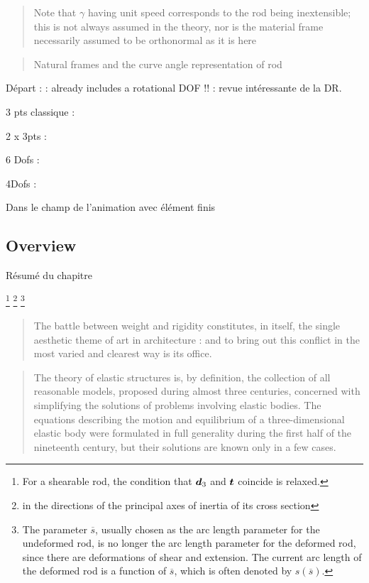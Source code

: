 \blockcquote[p.~607]{Langer1996}{Note that $\gamma$ having unit speed corresponds to the rod being inextensible; this is not always assumed in the theory, nor is the material frame necessarily assumed to be orthonormal as it is here}

\blockcquote[p.~607]{Langer1996}{Natural frames and the curve angle representation of rod}


Départ :
\cite{Day1965} : already includes a rotational DOF !!
\cite{Wakefield1980}
\cite{Barnes1999} : revue intéressante de la DR.

3 pts classique :
\cite{Adriaenssens1999}
\cite{Douthe2006}

2 x 3pts :
\cite{Barnes2013}

6 Dofs :
\cite{DAmico2014}

4Dofs :
\cite{DuPeloux2015}
\cite{DAmico2016}

Dans le champ de l'animation  avec élément finis
\cite{Duan2013}
\cite{Meier2014}


\subsection{Overview}
Résumé du chapitre

\footnote{For a shearable rod, the condition that $\boldsymbol{d}_3$ and $\boldsymbol{t}$ coincide is relaxed.}
\footnote{in the directions of the principal axes of inertia of its cross section}
\footnote{The parameter $\overbar{s}$, usually chosen as the arc length parameter for the undeformed rod, is no longer the arc length parameter for the deformed rod, since there are deformations of shear and extension. The current arc length of the deformed rod is a function of $\overbar{s}$, which is often denoted by $s(\overbar{s})$.}


\blockcquote[p.~xvii]{Benvenuto1991b}{The battle between weight and rigidity constitutes, in itself, the single aesthetic theme of art in architecture : and to bring out this conflict in the most varied and clearest way is its office.}

\blockcquote[p.~xvii]{Villaggio1997}{The theory of elastic structures is, by definition, the collection of all reasonable models, proposed during almost three centuries, concerned with simplifying the solutions of problems involving elastic bodies. The equations describing the motion and equilibrium of a three-dimensional elastic body were formulated in full generality during the first half of the nineteenth century, but their solutions are known only in a few cases.}

